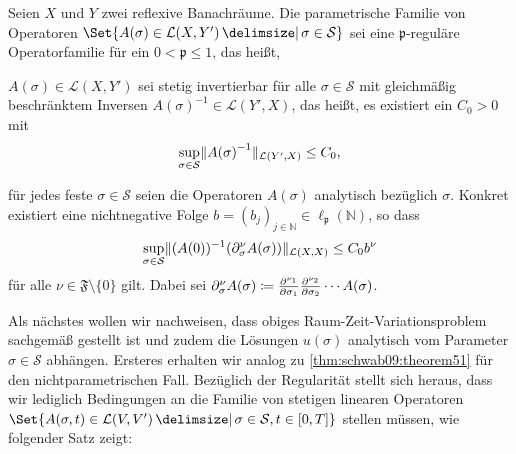 \begin{Annahme}
\label{thm:kunoth:assumption1}
    Seien $X$ und $Y$ zwei reflexive Banachräume.
    Die parametrische Familie von Operatoren
    $\Set{ A(\sigma) \in \mathcal L(X, Y') \given \sigma \in \mathcal S }$ sei eine $\mathfrak p$-reguläre Operatorfamilie für ein $0 < \mathfrak p \leq 1$, das heißt,
    \begin{thmenumerate}
        \item $A(\sigma) \in \mathcal L(X, Y')$ sei stetig invertierbar für alle $\sigma \in \mathcal S$ mit gleichmäßig beschränktem Inversen $A{(\sigma)}^{-1} \in \mathcal L(Y', X)$, das heißt, es existiert ein $C_{0} > 0$ mit
        \begin{equation}
            \sup_{\sigma \in \mathcal S} \lVert A{(\sigma)}^{-1}\rVert_{\mathcal L(Y', X)} \leq C_{0},
        \end{equation}
        \item für jedes feste $\sigma \in \mathcal S$ seien die Operatoren $A(\sigma)$ analytisch bezüglich $\sigma$.
        Konkret existiert eine nichtnegative Folge $b = (b_{j})_{j \in \mathbb{N}} \in \ell_{\mathfrak p}(\mathbb{N})$, so dass
        \begin{equation}
            \sup_{\sigma \in \mathcal S} \lVert(A{(0)})^{-1}(\partial^{\nu}_{\sigma} A(\sigma))\rVert_{\mathcal L(X, X)} \leq C_{0} b^{\nu}
        \end{equation}
        für alle $\nu \in \mathfrak F \setminus \{ 0 \}$ gilt.
        Dabei sei $\partial^{\nu}_{\sigma} A(\sigma) \coloneqq \frac{\partial^{\nu_{1}}}{\partial \sigma_{1}} \frac{\partial^{\nu_{2}}}{\partial \sigma_{2}} \cdots A(\sigma)$.
    \end{thmenumerate}
\end{Annahme}

Als nächstes wollen wir nachweisen, dass obiges Raum-Zeit-Variationsproblem sachgemäß gestellt ist und zudem die Lösungen $u(\sigma)$ analytisch vom Parameter $\sigma \in \mathcal S$ abhängen.
Ersteres erhalten wir analog zu \cref{thm:schwab09:theorem51} für den nichtparametrischen Fall.
Bezüglich der Regularität stellt sich heraus, dass wir lediglich Bedingungen an die Familie von stetigen linearen Operatoren $\Set{ A(\sigma, t) \in \mathcal L(V, V') \given \sigma \in \mathcal S, t \in [0, T] }$ stellen müssen, wie folgender Satz zeigt:

